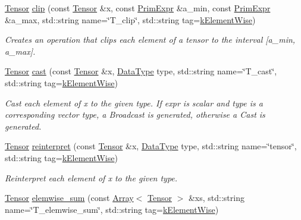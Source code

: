 \begin{DoxyCompactItemize}
\hyperlink{classtvm_1_1te_1_1Tensor}{Tensor} \hyperlink{namespacetopi_aea1d7c9456b658b57d97f80159ebe773}{clip} (const \hyperlink{classtvm_1_1te_1_1Tensor}{Tensor} \&x, const \hyperlink{classtvm_1_1PrimExpr}{Prim\+Expr} \&a\+\_\+min, const \hyperlink{classtvm_1_1PrimExpr}{Prim\+Expr} \&a\+\_\+max, std\+::string name=\char`\"{}T\+\_\+clip\char`\"{}, std\+::string tag=\hyperlink{namespacetopi_ac1b34ed59d38a5f5338bee6b2cad42be}{k\+Element\+Wise})
\begin{DoxyCompactList}\small\item\em Creates an operation that clips each element of a tensor to the interval \mbox{[}a\+\_\+min, a\+\_\+max\mbox{]}. \end{DoxyCompactList}\item 
\hyperlink{classtvm_1_1te_1_1Tensor}{Tensor} \hyperlink{namespacetopi_acfc3df84ca997ccac0f57d50e96c1c06}{cast} (const \hyperlink{classtvm_1_1te_1_1Tensor}{Tensor} \&x, \hyperlink{namespacetvm_a41918af1a1dc386388639a9d3ad06c5d}{Data\+Type} type, std\+::string name=\char`\"{}T\+\_\+cast\char`\"{}, std\+::string tag=\hyperlink{namespacetopi_ac1b34ed59d38a5f5338bee6b2cad42be}{k\+Element\+Wise})
\begin{DoxyCompactList}\small\item\em Cast each element of x to the given type. If expr is scalar and type is a corresponding vector type, a Broadcast is generated, otherwise a Cast is generated. \end{DoxyCompactList}\item 
\hyperlink{classtvm_1_1te_1_1Tensor}{Tensor} \hyperlink{namespacetopi_aef42f5cbf417ab34e319ff5a3ff7120f}{reinterpret} (const \hyperlink{classtvm_1_1te_1_1Tensor}{Tensor} \&x, \hyperlink{namespacetvm_a41918af1a1dc386388639a9d3ad06c5d}{Data\+Type} type, std\+::string name=\char`\"{}tensor\char`\"{}, std\+::string tag=\hyperlink{namespacetopi_ac1b34ed59d38a5f5338bee6b2cad42be}{k\+Element\+Wise})
\begin{DoxyCompactList}\small\item\em Reinterpret each element of x to the given type. \end{DoxyCompactList}\item 
\hyperlink{classtvm_1_1te_1_1Tensor}{Tensor} \hyperlink{namespacetopi_ae5844b930680196ff3c9cbbedc8a57d3}{elemwise\+\_\+sum} (const \hyperlink{classtvm_1_1Array}{Array}$<$ \hyperlink{classtvm_1_1te_1_1Tensor}{Tensor} $>$ \&xs, std\+::string name=\char`\"{}T\+\_\+elemwise\+\_\+sum\char`\"{}, std\+::string tag=\hyperlink{namespacetopi_ac1b34ed59d38a5f5338bee6b2cad42be}{k\+Element\+Wise})

\end{DoxyCompactItemize}
